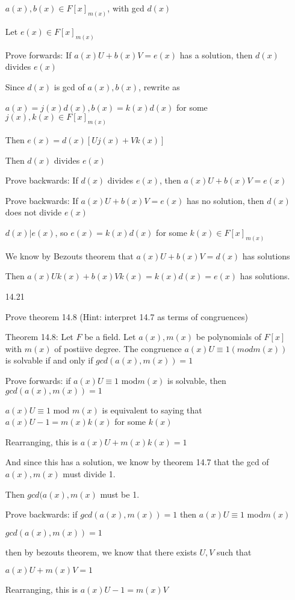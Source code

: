 \documentclass[12pt]{article}
\begin{document}
\begin{itemize}
	
		$a(x), b(x) \in F[x]_{m(x)}$, with gcd $d(x)$

		Let $e(x) \in F[x]_{m(x)}$

		Prove forwards: If $a(x)U + b(x)V = e(x)$ has a solution, then $d(x)$ divides $e(x)$

		Since $d(x)$ is gcd of $a(x), b(x)$, rewrite as

		$a(x) = j(x)d(x), b(x) = k(x)d(x)$ for some $j(x),k(x)\in F[x]_{m(x)}$

		Then $e(x) = d(x)[Uj(x) + Vk(x)]$

		Then $d(x)$ divides $e(x)$

		Prove backwards: If $d(x)$ divides $e(x)$, then $a(x)U + b(x)V = e(x)$

		Prove backwards: If $a(x)U + b(x)V = e(x)$ has no solution, then $d(x)$ does not divide $e(x)$

		$d(x)|e(x)$, so $e(x) = k(x)d(x)$ for some $k(x)\in F[x]_{m(x)}$

	 	We know by Bezouts theorem that $a(x)U + b(x)V = d(x)$ has solutions

		Then $a(x)Uk(x) + b(x)Vk(x) = k(x)d(x) = e(x)$ has solutions.

\newpage 
\item[14.21]

	Prove theorem 14.8 (Hint: interpret 14.7 as terms of congruences)

	Theorem 14.8: Let $F$ be a field. Let $a(x), m(x)$ be polynomials of $F[x]$ with $m(x)$ of postiive degree. The congruence $a(x)U \equiv 1 (modm(x))$ is solvable if and only if $gcd(a(x),m(x)) = 1$

	Prove forwards: if $a(x)U \equiv 1$ mod$m(x)$ is solvable, then $gcd(a(x),m(x)) = 1$

	$a(x)U \equiv 1$ mod $m(x)$ is equivalent to saying that $a(x)U - 1 = m(x)k(x)$ for some $k(x)$

	Rearranging, this is $a(x)U + m(x)k(x) = 1$

	And since this has a solution, we know by theorem 14.7 that the gcd of $a(x), m(x)$ must divide 1.

	Then $gcd(a(x),m(x)$ must be 1.


	Prove backwards: if $gcd(a(x),m(x)) = 1$ then $a(x)U \equiv 1$ mod$m(x)$

	$gcd(a(x),m(x)) = 1$

	then by bezouts theorem, we know that there exists $U,V$ such that 

	$a(x)U + m(x)V = 1$

	Rearranging, this is $a(x)U - 1 = m(x)V$


\end{itemize}
\end{document}
